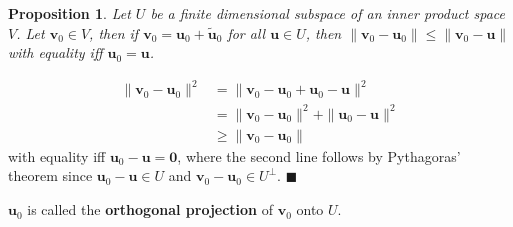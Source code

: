 \documentclass[letter-paper]{tufte-book}
\newtheorem{proposition}[theorem]{\color{pastel-blue}Proposition}
\newenvironment{proof}[1][Proof]{\begin{trivlist}
\item[\hskip \labelsep {\bfseries #1}]}{\end{trivlist}}
\newcommand{\Ob}{{\boldsymbol{0}}}
\newcommand{\ub}{{\boldsymbol{u}}}
\newcommand{\vb}{{\boldsymbol{v}}}
\newcommand{\qed}{\hfill$\blacksquare$}
\begin{document}
\begin{proposition}
  Let $U$ be a finite dimensional subspace of an inner product space $V$. Let $\vb_0 \in V$, then if $\vb_0 = \ub_0 + \tilde{\ub}_0$ for all $\ub\in U$, then $\|\vb_0 - \ub_0\| \leq \|\vb_0 - \ub\|$ with equality iff $\ub_0 = \ub$.
\end{proposition}

\begin{proof}
  \begin{align*}
    \|\vb_0 - \ub_0\|^2
      &= \|\vb_0 - \ub_0 + \ub_0 - \ub\|^2\\
      &= \|\vb_0 - \ub_0\|^2 + \|\ub_0 - \ub\|^2\\
      &\geq \|\vb_0 - \ub_0\|
  \end{align*}
  with equality iff $\ub_0 - \ub = \Ob$, where the second line follows by Pythagoras' theorem since $\ub_0 - \ub \in U$ and $\vb_0 - \ub_0 \in U^\perp$. \qed
\end{proof}

$\ub_0$ is called the \textbf{orthogonal projection} of $\vb_0$ onto $U$.
\end{document}
